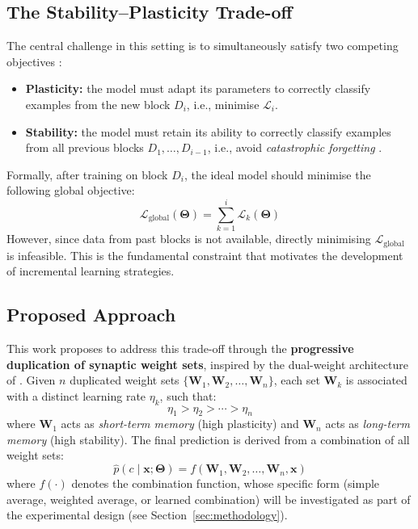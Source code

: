 \subsection*{The Stability--Plasticity Trade-off}

The central challenge in this setting is to simultaneously satisfy two competing 
objectives \cite{de2021continual, PARISI201954}:

\begin{itemize}
    \item \textbf{Plasticity:} the model must adapt its parameters to correctly 
    classify examples from the new block $D_i$, i.e., minimise $\mathcal{L}_i$.
    
    \item \textbf{Stability:} the model must retain its ability to correctly 
    classify examples from all previous blocks $D_1, \ldots, D_{i-1}$, i.e., 
    avoid \textit{catastrophic forgetting} \cite{goodfellow2013catastrophic, 
    kirkpatrick2017overcoming}.
\end{itemize}

Formally, after training on block $D_i$, the ideal model should minimise the 
following global objective:
\[
\mathcal{L}_{\text{global}}(\boldsymbol{\Theta}) = \sum_{k=1}^{i} 
\mathcal{L}_k(\boldsymbol{\Theta})
\]
However, since data from past blocks is not available, directly minimising 
$\mathcal{L}_{\text{global}}$ is infeasible. This is the fundamental constraint 
that motivates the development of incremental learning strategies.

\subsection*{Proposed Approach}

This work proposes to address this trade-off through the \textbf{progressive 
duplication of synaptic weight sets}, inspired by the dual-weight architecture 
of \cite{bullinaria2009}. Given $n$ duplicated weight sets 
$\{\mathbf{W}_1, \mathbf{W}_2, \ldots, \mathbf{W}_n\}$, each set $\mathbf{W}_k$ 
is associated with a distinct learning rate $\eta_k$, such that:
\[
\eta_1 > \eta_2 > \cdots > \eta_n
\]
where $\mathbf{W}_1$ acts as \textit{short-term memory} (high plasticity) and 
$\mathbf{W}_n$ acts as \textit{long-term memory} (high stability). The final 
prediction is derived from a combination of all weight sets:
\[
\hat{p}(c \mid \mathbf{x}; \boldsymbol{\Theta}) = f\left(\mathbf{W}_1, 
\mathbf{W}_2, \ldots, \mathbf{W}_n, \mathbf{x}\right)
\]
where $f(\cdot)$ denotes the combination function, whose specific form 
(simple average, weighted average, or learned combination) will be investigated 
as part of the experimental design (see Section~\ref{sec:methodology}).